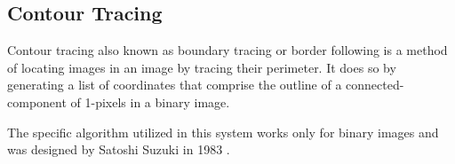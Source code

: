 \subsection{Contour Tracing}

Contour tracing also known as boundary tracing or border following is a method of locating images in an image by tracing their perimeter. It does so by generating a list of coordinates that comprise the outline of a connected-component of 1-pixels in a binary image. 


The specific algorithm utilized in this system works only for binary images and was designed by Satoshi Suzuki in 1983 \cite{satoshi_findContours}. 